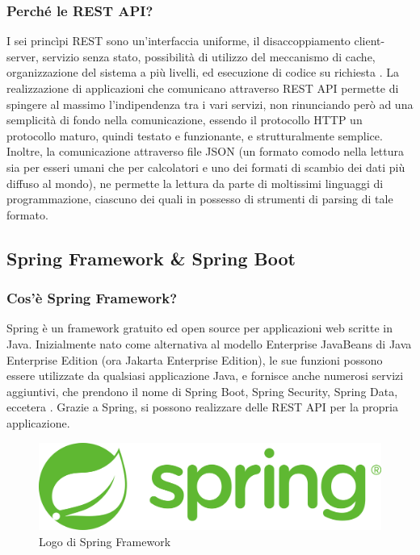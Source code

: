            \subsubsection{Perché le REST API?}
                I sei princìpi REST sono un'interfaccia uniforme, il disaccoppiamento client-server, servizio senza stato, possibilità di utilizzo del meccanismo di cache, organizzazione del sistema a più livelli, ed esecuzione di codice su richiesta \cite{IBM1}. La realizzazione di applicazioni che comunicano attraverso REST API permette di spingere al massimo l'indipendenza tra i vari servizi, non rinunciando però ad una semplicità di fondo nella comunicazione, essendo il protocollo HTTP un protocollo maturo, quindi testato e funzionante, e strutturalmente semplice. Inoltre, la comunicazione attraverso file JSON (un formato comodo nella lettura sia per esseri umani che per calcolatori e uno dei formati di scambio dei dati più diffuso al mondo), ne permette la lettura da parte di moltissimi linguaggi di programmazione, ciascuno dei quali in possesso di strumenti di parsing di tale formato.
            
        \subsection{Spring Framework \& Spring Boot}
            \subsubsection{Cos'è Spring Framework?}
                Spring è un framework gratuito ed open source per applicazioni web scritte in Java. Inizialmente nato come alternativa al modello Enterprise JavaBeans di Java Enterprise Edition (ora Jakarta Enterprise Edition), le sue funzioni possono essere utilizzate da qualsiasi applicazione Java, e fornisce anche numerosi servizi aggiuntivi, che prendono il nome di Spring Boot, Spring Security, Spring Data, eccetera \cite{Wikipedia4}. Grazie a Spring, si possono realizzare delle REST API per la propria applicazione.
            \begin{figure}[htbp!]
                \centering
                \includegraphics[width=0.5\linewidth]{Immagini/System Design/Spring.png}
                \caption{Logo di Spring Framework}
            \end{figure}
